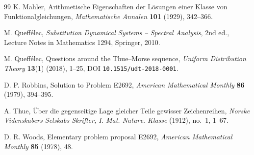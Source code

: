 \documentclass[11pt,oneside]{article}
\theoremstyle{definition}
\theoremstyle{remark}
\begin{document}
\begin{thebibliography}{99}
K. Mahler,
Arithmetische Eigenschaften der L\"osungen einer Klasse von
Funktionalgleichungen,
\emph{Mathematische Annalen} \textbf{101} (1929), 342--366.

M. Queff\'elec,
\emph{Substitution Dynamical Systems -- Spectral Analysis},
2nd ed., Lecture Notes in Mathematics 1294, Springer, 2010.

M. Queff\'elec,
Questions around the Thue--Morse sequence,
\emph{Uniform Distribution Theory} \textbf{13}(1) (2018), 1--25,
DOI \nolinkurl{10.1515/udt-2018-0001}.

D. P. Robbins,
Solution to Problem E2692,
\emph{American Mathematical Monthly} \textbf{86} (1979), 394--395.

A. Thue,
\"Uber die gegenseitige Lage gleicher Teile gewisser Zeichenreihen,
\emph{Norske Videnskabers Selskabs Skrifter, I. Mat.-Naturv. Klasse}
(1912), no.~1, 1--67.

D. R. Woods,
Elementary problem proposal E2692,
\emph{American Mathematical Monthly} \textbf{85} (1978), 48.

\end{thebibliography}
\end{document}
